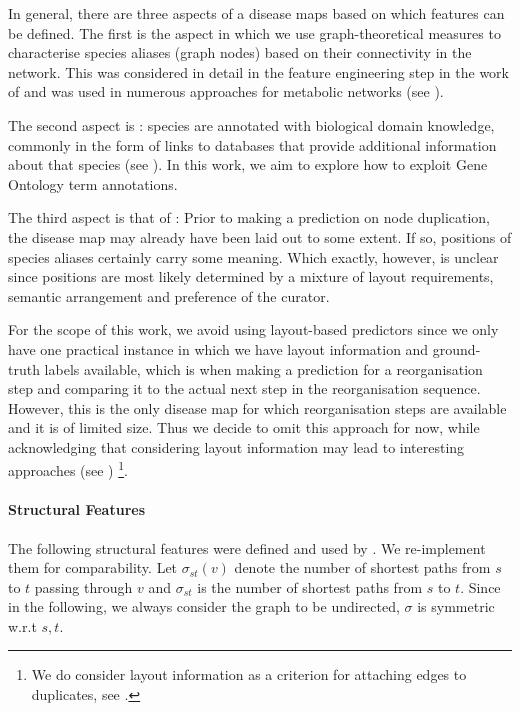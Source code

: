 \documentclass[
	fontsize=10pt, %
	twoside=false, %
	secnumdepth=1, %
  toc=indentunnumbered %
]{kaobook}
\begin{document}
In general, there are three aspects of a disease maps based on which features
can be defined. The first is the  aspect in which we use
graph-theoretical measures to characterise species aliases (graph nodes) based
on their connectivity in the network. This was considered in detail in the
feature engineering step in the work of
\citeauthor{nielsen_MachineLearningSupport_2019}
\cite{nielsen_MachineLearningSupport_2019}
and was used in numerous
approaches for metabolic networks (see ).

The second aspect is : species are annotated with biological
domain knowledge, commonly in the form of links to databases that provide
additional information about that species (see ). In
this work, we aim to explore how to exploit Gene Ontology term annotations.

The third aspect is that of : Prior to making a prediction on node
duplication, the disease map may already have been laid out to some extent.
If so, positions of species aliases certainly carry some meaning. Which exactly,
however, is unclear since positions are most likely determined by a mixture of
layout requirements, semantic arrangement and preference of the curator.

For the scope of this work, we avoid using layout-based predictors
since we only have one practical instance in which we have layout information
and ground-truth labels available, which is when making a prediction for a
 reorganisation step and comparing it to the actual next
step in the reorganisation sequence. However, this is the only disease map for
which reorganisation steps are available and it is of limited size. Thus we
decide to omit this approach for now, while acknowledging that considering
layout information may lead to interesting approaches (see
) \footnote{ We do consider layout information as a
  criterion for attaching edges to duplicates, see . }.




\paragraph{Structural Features} The following structural features were defined
and used by \citeauthor{nielsen_MachineLearningSupport_2019}. We re-implement
them for comparability. Let $\sigma_{st}(v)$ denote the number of shortest paths
from $s$ to $t$ passing through $v$ and $\sigma_{st}$ is the number of shortest
paths from $s$ to $t$. Since in the following, we always consider the graph to
be undirected, $\sigma$ is symmetric w.r.t $s, t$. 
\end{document}
